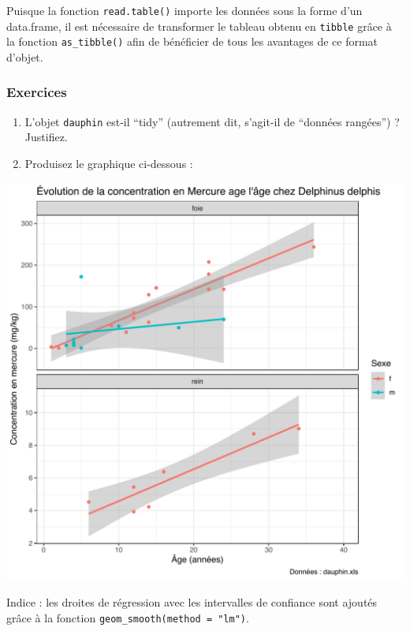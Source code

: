 \documentclass[a4paperpaper,]{article}
\providecommand{\tightlist}{%
  \setlength{\itemsep}{0pt}\setlength{\parskip}{0pt}}
\begin{document}
Puisque la fonction \texttt{read.table()} importe les données sous la forme d'un data.frame, il est nécessaire de transformer le tableau obtenu en \texttt{tibble} grâce à la fonction \texttt{as\_tibble()} afin de bénéficier de tous les avantages de ce format d'objet.

\hypertarget{exercices-8}{%
\subsubsection{Exercices}\label{exercices-8}}

\begin{enumerate}
\def\labelenumi{\arabic{enumi}.}
\tightlist
\item
  L'objet \texttt{dauphin} est-il ``tidy'' (autrement dit, s'agit-il de ``données rangées'') ? Justifiez.
\item
  Produisez le graphique ci-dessous :
\end{enumerate}

\begin{center}\includegraphics[width=0.9\linewidth]{figure/exercicedauphin-1} \end{center}

Indice : les droites de régression avec les intervalles de confiance sont ajoutés grâce à la fonction \texttt{geom\_smooth(method\ =\ "lm")}.
\end{document}
